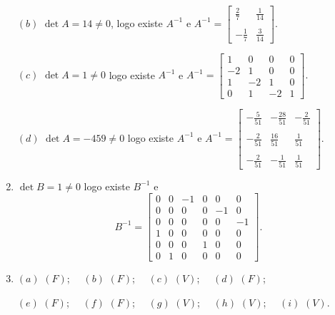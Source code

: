 \documentclass{report}
\begin{document}
\begin{enumerate}
$(b)$ $\det A=14 \ne 0$, logo existe $A^{-1}$ e $A^{-1}=\left[
\begin{array}{rr}
\frac{2}{7} & \frac{1}{14} \\
& \\
 -\frac{1}{7} & \frac{3}{14}
\end{array}
\right].$


$(c)$ $\det A=1 \ne 0$ logo existe $A^{-1}$ e $A^{-1}=\left[
\begin{array}{rrrr}
1 & 0 & 0 & 0 \\
-2 & 1 & 0 & 0 \\
1 & -2 & 1 & 0 \\
0 & 1 & -2 & 1
\end{array}
\right].$

$(d)$ $\det A=-459 \ne 0$ logo existe $A^{-1}$ e $A^{-1}=\left[
\begin{array}{rrr}
-\frac{5}{51} & -\frac{28}{51} & -\frac{2}{51} \\
& & \\
-\frac{2}{51} & \frac{16}{51} & \frac{1}{51} \\
& & \\
-\frac{2}{51} & -\frac{1}{51} & \frac{1}{51}
\end{array}
\right].$



\item $\det B=1 \ne 0$ logo existe $B^{-1}$ e $$B^{-1}=\left[
\begin{array}{rrrrrr}
0 & 0 & -1 & 0 & 0 & 0 \\
0 & 0 & 0 & 0 & -1 & 0\\
0 & 0 & 0 & 0 & 0 & -1\\
1 & 0 & 0 & 0 & 0 & 0 \\
0 & 0 & 0 & 1 & 0 & 0 \\
0 & 1 & 0 & 0 & 0 & 0
\end{array}
\right].$$


\item $(a)$ $(F)$; \ \ $(b)$ $(F)$; \ \ $(c)$ $(V)$; \ \ $(d)$
$(F)$;

$(e)$ $(F)$; \ \ $(f)$ $(F)$; \ \ $(g)$ $(V)$; \ \ $(h)$ $(V)$; \
\ $(i)$ $(V)$.



\end{enumerate}
\end{document}
